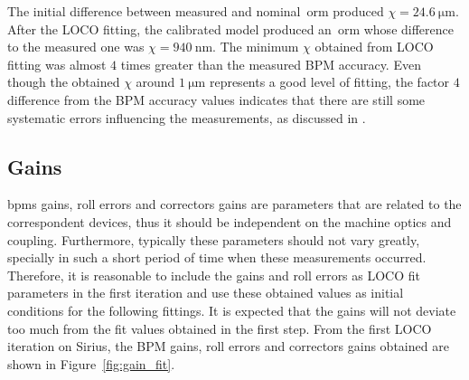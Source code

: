 The initial difference between measured and nominal~\gls{orm} produced $\chi = \SI{24.6}{\micro\meter}$. After the LOCO fitting, the calibrated model produced an~\gls{orm} whose difference to the measured one was $\chi = \SI{940}{\nano\meter}$. The minimum $\chi$ obtained from LOCO fitting was almost $4$ times greater than the measured BPM accuracy. Even though the obtained $\chi$ around $\SI{1}{\micro\meter}$ represents a good level of fitting, the factor $4$ difference from the BPM accuracy values indicates that there are still some systematic errors influencing the measurements, as discussed in \cite{safranek1995}.

\subsection{Gains}
\glspl{bpm} gains, roll errors and correctors gains are parameters that are related to the correspondent devices, thus it should be independent on the machine optics and coupling. Furthermore, typically these parameters should not vary greatly, specially in such a short period of time when these measurements occurred. Therefore, it is reasonable to include the gains and roll errors as LOCO fit parameters in the first iteration and use these obtained values as initial conditions for the following fittings. It is expected that the gains will not deviate too much from the fit values obtained in the first step. From the first LOCO iteration on Sirius, the BPM gains, roll errors and correctors gains obtained are shown in Figure~\ref{fig:gain_fit}.
